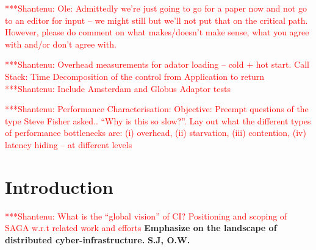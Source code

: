 \documentclass[a4paper,10pt]{article}
\newcommand{\jhanote}[1]{  {\textcolor{red}     { ***Shantenu: #1 }}}
\newcommand{\jhanote}[1]{}
\begin{document}
\jhanote{Ole: Admittedly we're just going to go for a paper now and
  not go to an editor for input -- we might still but we'll not put
  that on the critical path. However, please do comment on what
  makes/doesn't make sense, what you agree with and/or don't agree
  with.}



\jhanote{Overhead measurements for adator loading -- cold + hot
  start. Call Stack: Time Decomposition of the control from
  Application to return} \jhanote{Include Amsterdam and Globus Adaptor
  tests}

\jhanote{Performance Characterisation: Objective: Preempt questions of
  the type Steve Fisher asked.. ``Why is this so slow?''. Lay out what
  the different types of performance bottlenecks are: (i) overhead,
  (ii) starvation, (iii) contention, (iv) latency hiding -- at
  different levels}





\section{Introduction}



\jhanote{What is the ``global vision'' of CI? Positioning and scoping
  of SAGA w.r.t related work and efforts}
\textbf{Emphasize on the landscape of distributed
  cyber-infrastructure.} \textbf{S.J, O.W.}


 
\end{document}
